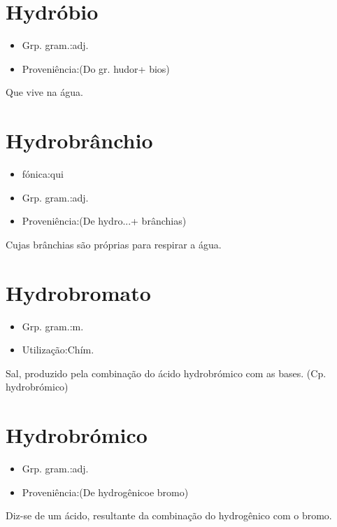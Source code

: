 \documentclass{article}
\begin{document}
\section{Hydróbio}
\begin{itemize}
\item {Grp. gram.:adj.}
\end{itemize}
\begin{itemize}
\item {Proveniência:(Do gr. \textunderscore hudor\textunderscore  + \textunderscore bios\textunderscore )}
\end{itemize}
Que vive na água.
\section{Hydrobrânchio}
\begin{itemize}
\item {fónica:qui}
\end{itemize}
\begin{itemize}
\item {Grp. gram.:adj.}
\end{itemize}
\begin{itemize}
\item {Proveniência:(De \textunderscore hydro...\textunderscore  + \textunderscore brânchias\textunderscore )}
\end{itemize}
Cujas brânchias são próprias para respirar a água.
\section{Hydrobromato}
\begin{itemize}
\item {Grp. gram.:m.}
\end{itemize}
\begin{itemize}
\item {Utilização:Chím.}
\end{itemize}
Sal, produzido pela combinação do ácido hydrobrómico com as bases.
(Cp. \textunderscore hydrobrómico\textunderscore )
\section{Hydrobrómico}
\begin{itemize}
\item {Grp. gram.:adj.}
\end{itemize}
\begin{itemize}
\item {Proveniência:(De \textunderscore hydrogênico\textunderscore  e \textunderscore bromo\textunderscore )}
\end{itemize}
Diz-se de um ácido, resultante da combinação do hydrogênico com o bromo.
\end{document}
